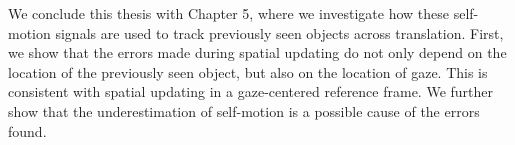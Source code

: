 We conclude this thesis with Chapter 5, where we investigate how these self-motion signals are used to track previously seen objects across translation. First, we show that the errors made during spatial updating do not only depend on the location of the previously seen object, but also on the location of gaze. This is consistent with spatial updating in a gaze-centered reference frame. We further show that the underestimation of self-motion is a possible cause of the errors found.
